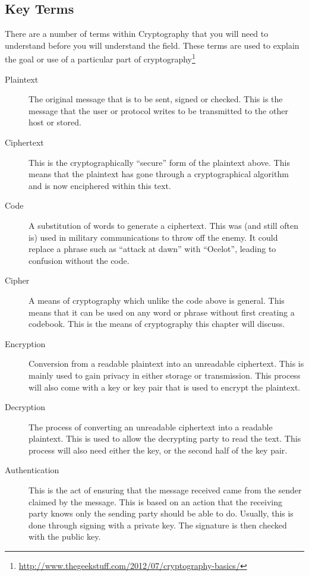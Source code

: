 		\subsection{Key Terms}
			There are a number of terms within Cryptography that you will need to understand before you will understand the field.
			These terms are used to explain the goal or use of a particular part of cryptography\footnote{\url{http://www.thegeekstuff.com/2012/07/cryptography-basics/}}
			\begin{description}
				\item[Plaintext]
					The original message that is to be sent, signed or checked. 
					This is the message that the user or protocol writes to be transmitted to the other host or stored. 
				\item[Ciphertext]
					This is the cryptographically ``secure'' form of the plaintext above. 
					This means that the plaintext has gone through a cryptographical algorithm and is now enciphered within this text. 
				\item[Code] A substitution of words to generate a ciphertext. 
					This was (and still often is) used in military communications to throw off the enemy. 
					It could replace a phrase such as ``attack at dawn'' with ``Ocelot'', leading to confusion without the code. 
				\item[Cipher] A means of cryptography which unlike the code above is general. 
					This means that it can be used on any word or phrase without first creating a codebook. 
					This is the means of cryptography this chapter will discuss.
				\item[Encryption]
					Conversion from a readable plaintext into an unreadable ciphertext. 
					This is mainly used to gain privacy in either storage or transmission. 
					This process will also come with a key or key pair that is used to encrypt the plaintext. 
				\item[Decryption]
					The process of converting an unreadable ciphertext into a readable plaintext. 
					This is used to allow the decrypting party to read the text. 
					This process will also need either the key, or the second half of the key pair. 
				\item[Authentication]
					This is the act of ensuring that the message received came from the sender claimed by the message. 
					This is based on an action that the receiving party knows only the sending party should be able to do. 
					Usually, this is done through signing with a private key. 
					The signature is then checked with the public key. 

\end{description}
